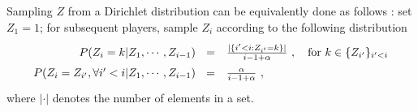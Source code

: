 Sampling $Z$ from a Dirichlet distribution can be equivalently done as follows \cite{neal2000markov}: 
set $Z_1 = 1$; for subsequent players, sample $Z_i$ according to  the following distribution 
\begin{equation*}
\label{eq:condition}
\renewcommand*{\arraystretch}{1.5}
\begin{array}{rl}
    P(Z_i = k | Z_1, \cdots, Z_{i-1}) 
~~=& \frac{|\{i' < i : Z_{i'} = k\}|}{i-1 + \alpha}  ~, \quad \text{for } k \in \{Z_{i'}\}_{i' < i}  \\
   P(Z_i = Z_{i'}, \forall i' < i | Z_1, \cdots, Z_{i-1}) 
~~=& \frac{\alpha}{i-1 + \alpha} ~,
\end{array}
\end{equation*}
where $|\cdot|$ denotes the number of elements in a set.

